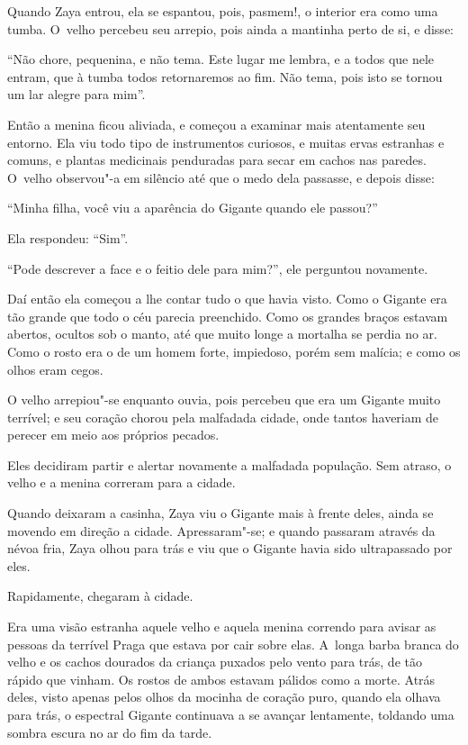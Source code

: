 Quando Zaya entrou, ela se espantou, pois, pasmem!, o interior era como
uma tumba. O~velho percebeu seu arrepio, pois ainda a mantinha perto de
si, e disse:

``Não chore, pequenina, e não tema. Este lugar me lembra, e a todos que
nele entram, que à tumba todos retornaremos ao fim. Não tema, pois isto
se tornou um lar alegre para mim''.

Então a menina ficou aliviada, e começou a examinar mais atentamente seu
entorno. Ela viu todo tipo de instrumentos curiosos, e muitas ervas
estranhas e comuns, e plantas medicinais penduradas para secar em cachos
nas paredes. O~velho observou"-a em silêncio até que o medo dela
passasse, e depois disse:

``Minha filha, você viu a aparência do Gigante quando ele passou?''

Ela respondeu: ``Sim''.

``Pode descrever a face e o feitio dele para mim?'', ele perguntou
novamente.

Daí então ela começou a lhe contar tudo o que havia visto. Como o
Gigante era tão grande que todo o céu parecia preenchido. Como os
grandes braços estavam abertos, ocultos sob o manto, até que muito longe
a mortalha se perdia no ar. Como o rosto era o de um homem forte,
impiedoso, porém sem malícia; e como os olhos eram cegos.

O velho arrepiou"-se enquanto ouvia, pois percebeu que era um Gigante
muito terrível; e seu coração chorou pela malfadada cidade, onde tantos
haveriam de perecer em meio aos próprios pecados.

Eles decidiram partir e alertar novamente a malfadada população. Sem
atraso, o velho e a menina correram para a cidade.

Quando deixaram a casinha, Zaya viu o Gigante mais à frente deles, ainda
se movendo em direção a cidade. Apressaram"-se; e quando passaram através
da névoa fria, Zaya olhou para trás e viu que o Gigante havia sido
ultrapassado por eles.

Rapidamente, chegaram à cidade.

Era uma visão estranha aquele velho e aquela menina correndo para avisar
as pessoas da terrível Praga que estava por cair sobre elas. A~longa
barba branca do velho e os cachos dourados da criança puxados pelo vento
para trás, de tão rápido que vinham. Os rostos de ambos estavam pálidos
como a morte. Atrás deles, visto apenas pelos olhos da mocinha de
coração puro, quando ela olhava para trás, o espectral Gigante
continuava a se avançar lentamente, toldando uma sombra escura no ar do
fim da tarde.

